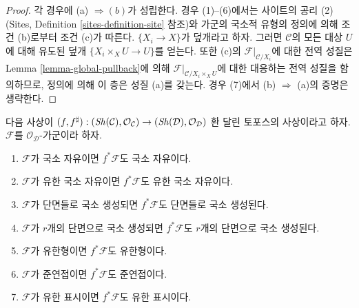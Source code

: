 \begin{proof}
각 경우에 (a) $\Rightarrow (b)$가 성립한다. 경우 (1)--(6)에서는 사이트의
공리 (2)(Sites, Definition \ref{sites-definition-site} 참조)와 가군의 국소적
유형의 정의에 의해 조건 (b)로부터 조건 (c)가 따른다.
$\{X_i \to X\}$가 덮개라고 하자. 그러면 $\mathcal{C}$의 모든 대상 $U$에
대해 유도된 덮개 $\{X_i \times_X U \to U\}$를 얻는다. 또한 (c)의
$\mathcal{F}|_{\mathcal{C}/X_i}$에 대한 전역 성질은 Lemma
\ref{lemma-global-pullback}에 의해
$\mathcal{F}|_{\mathcal{C}/X_i \times_X U}$에 대한 대응하는 전역 성질을
함의하므로, 정의에 의해 이 층은 성질 (a)를 갖는다. 경우 (7)에서
(b) $\Rightarrow$ (a)의 증명은 생략한다.
\end{proof}

\begin{lemma}
\label{lemma-local-pullback}
다음 사상이
$(f, f^\sharp) :
(\mathop{\mathit{Sh}}\nolimits(\mathcal{C}), \mathcal{O}_\mathcal{C})
\to
(\mathop{\mathit{Sh}}\nolimits(\mathcal{D}), \mathcal{O}_\mathcal{D})$
환 달린 토포스의 사상이라고 하자. $\mathcal{F}$를
$\mathcal{O}_\mathcal{D}$-가군이라 하자.
\begin{enumerate}
\item $\mathcal{F}$가 국소 자유이면 $f^*\mathcal{F}$도 국소 자유이다.
\item $\mathcal{F}$가 유한 국소 자유이면 $f^*\mathcal{F}$도 유한 국소
자유이다.
\item $\mathcal{F}$가 단면들로 국소 생성되면 $f^*\mathcal{F}$도 단면들로
국소 생성된다.
\item $\mathcal{F}$가 $r$개의 단면으로 국소 생성되면
$f^*\mathcal{F}$도 $r$개의 단면으로 국소 생성된다.
\item $\mathcal{F}$가 유한형이면 $f^*\mathcal{F}$도 유한형이다.
\item $\mathcal{F}$가 준연접이면 $f^*\mathcal{F}$도 준연접이다.
\item $\mathcal{F}$가 유한 표시이면 $f^*\mathcal{F}$도 유한 표시이다.
\end{enumerate}
\end{lemma}


